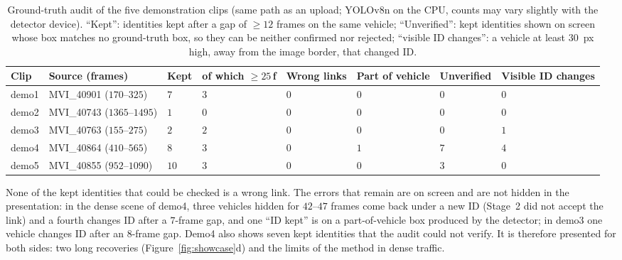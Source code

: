 \begin{table}[H]
    \centering
    \caption{Ground-truth audit of the five demonstration clips (same path as an upload; YOLOv8n on the CPU, counts may vary slightly with the detector device). ``Kept'': identities kept after a gap of $\ge 12$ frames on the same vehicle; ``Unverified'': kept identities shown on screen whose box matches no ground-truth box, so they can be neither confirmed nor rejected; ``visible ID changes'': a vehicle at least $30$~px high, away from the image border, that changed ID.}
    \label{tab:demo3}
    \small
    \begin{tabularx}{\textwidth}{l l C C C C C C}
        \toprule
        \textbf{Clip} & \textbf{Source (frames)} & \textbf{Kept} & \textbf{of which $\ge 25$\,f} & \textbf{Wrong links} & \textbf{Part of vehicle} & \textbf{Unver\-ified} & \textbf{Visible ID changes} \\
        \midrule
        demo1 & MVI\_40901 ($170$--$325$) & $7$ & $3$ & $0$ & $0$ & $0$ & $0$ \\
        demo2 & MVI\_40743 ($1365$--$1495$) & $1$ & $0$ & $0$ & $0$ & $0$ & $0$ \\
        demo3 & MVI\_40763 ($155$--$275$) & $2$ & $2$ & $0$ & $0$ & $0$ & $1$ \\
        demo4 & MVI\_40864 ($410$--$565$) & $8$ & $3$ & $0$ & $1$ & $7$ & $4$ \\
        demo5 & MVI\_40855 ($952$--$1090$) & $10$ & $3$ & $0$ & $0$ & $3$ & $0$ \\
        \bottomrule
    \end{tabularx}
\end{table}

None of the kept identities that could be checked is a wrong link. The errors that remain are on screen and are not hidden in the presentation: in the dense scene of demo4, three vehicles hidden for $42$--$47$ frames come back under a new ID (Stage~2 did not accept the link) and a fourth changes ID after a $7$-frame gap, and one ``ID kept'' is on a part-of-vehicle box produced by the detector; in demo3 one vehicle changes ID after an $8$-frame gap. Demo4 also shows seven kept identities that the audit could not verify. It is therefore presented for both sides: two long recoveries (Figure~\ref{fig:showcase}d) and the limits of the method in dense traffic.

